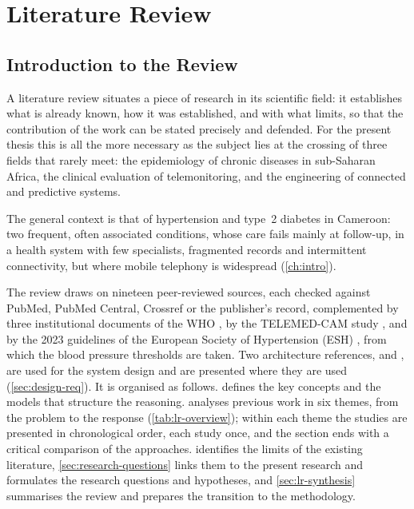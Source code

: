 \chapter{Literature Review}\label{ch:litreview}\label{ch:background}

\section{Introduction to the Review}\label{sec:lr-intro}

A literature review situates a piece of research in its scientific field: it establishes what is already known, how it was established, and with what limits, so that the contribution of the work can be stated precisely and defended. For the present thesis this is all the more necessary as the subject lies at the crossing of three fields that rarely meet: the epidemiology of chronic diseases in sub-Saharan Africa, the clinical evaluation of telemonitoring, and the engineering of connected and predictive systems.

The general context is that of hypertension and type~2 diabetes in Cameroon: two frequent, often associated conditions, whose care fails mainly at follow-up, in a health system with few specialists, fragmented records and intermittent connectivity, but where mobile telephony is widespread (\cref{ch:intro}).

The review draws on nineteen peer-reviewed sources, each checked against PubMed, PubMed Central, Crossref or the publisher's record, complemented by three institutional documents of the WHO \parencite{who2023hypertension,who2021guideline,whoHEARTS}, by the TELEMED-CAM study \parencite{kingue2013}, and by the 2023 guidelines of the European Society of Hypertension (ESH) \parencite{mancia2023}, from which the blood pressure thresholds are taken. Two architecture references, \textcite{mucchi2021} and \textcite{yazdani2018}, are used for the system design and are presented where they are used (\cref{sec:design-req}). It is organised as follows.  defines the key concepts and the models that structure the reasoning.  analyses previous work in six themes, from the problem to the response (\cref{tab:lr-overview}); within each theme the studies are presented in chronological order, each study once, and the section ends with a critical comparison of the approaches.  identifies the limits of the existing literature, \cref{sec:research-questions} links them to the present research and formulates the research questions and hypotheses, and \cref{sec:lr-synthesis} summarises the review and prepares the transition to the methodology.

